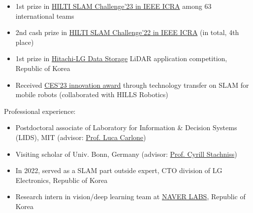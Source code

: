 {\begin{cvitems}
\begin{itemize}
          \item {1st prize in \href{https://hilti-challenge.com/}{HILTI SLAM Challenge'23 in IEEE ICRA} among 63 international teams\lineintv}
          \item {2nd cash prize in \href{https://hilti-challenge.com/}{HILTI SLAM Challenge'22 in IEEE ICRA} (in total, 4th place)\lineintv}
          \item {1st prize in \href{https://hitachi-lg.com/}{Hitachi-LG Data Storage} LiDAR application competition, Republic of Korea\lineintv}
          \item {Received \href{https://www.ces.tech/innovation-awards/honorees/2023/honorees/h/hi-bot-hologram-image-guide-robot.aspx}{CES'23 innovation award} through technology transfer on SLAM for mobile robots (collaborated with HILLS Robotics)\lineintv}
        \end{itemize}
      \item Professional experience:
        \begin{itemize}
          \item {Postdoctoral associate of Laboratory for Information \& Decision Systems (LIDS), MIT (advisor: \href{https://lucacarlone.mit.edu/}{Prof. Luca Carlone})\lineintv}
          \item {Visiting scholar of Univ. Bonn, Germany (advisor: \href{https://www.ipb.uni-bonn.de/people/cyrill-stachniss/index.html}{Prof. Cyrill Stachniss})\lineintv}
          \item {In 2022, served as a SLAM part outside expert, CTO division of LG Electronics, Republic of Korea\lineintv}
          \item {Research intern in vision/deep learning team at \href{https://www.naverlabs.com/}{NAVER LABS}, Republic of Korea\lineintv}
        \end{itemize}
    \end{cvitems}
  }


